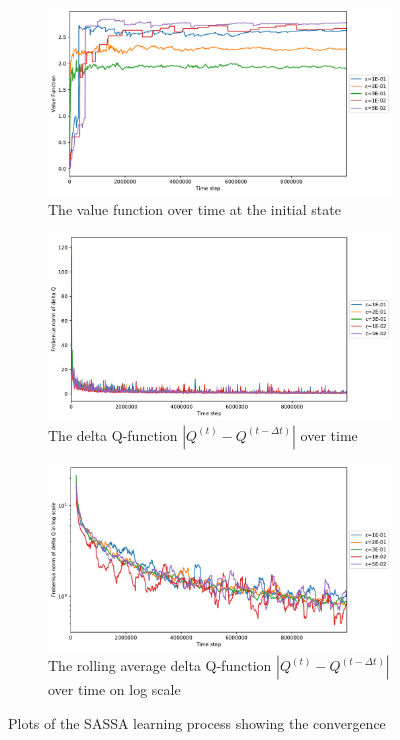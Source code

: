\documentclass{article}
\begin{document}
\begin{figure}
  \centering
  \begin{subfigure}{\textwidth}
    \centering
    \includegraphics[width=.8\linewidth]{sassa_v_fun_0.pdf}
    \caption{The value function over time at the initial state}
    \label{fig:sassa-v0}
  \end{subfigure}
  \begin{subfigure}{\textwidth}
    \centering
    \includegraphics[width=.8\linewidth]{sassa_norm_delta_q.pdf}
    \caption{The delta Q-function $|Q^{(t)} - Q^{(t-\Delta t)}|$ over time}
    \label{fig:sassa-delta-q}
  \end{subfigure}
  \begin{subfigure}{\textwidth}
    \centering
    \includegraphics[width=.8\linewidth]{sassa_norm_delta_q_log.pdf}
    \caption{The rolling average delta Q-function $|Q^{(t)} - Q^{(t-\Delta t)}|$ over time on log scale}
    \label{fig:sassa-delta-q-log}
  \end{subfigure}
  \caption{Plots of the SASSA learning process showing the convergence}
\end{figure}
\end{document}
